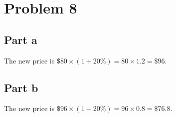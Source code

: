 \section*{Problem 8}
\subsection*{Part a}
The new price is $ \$80 \times (1 + 20\%) = 80 \times 1.2 = \$96 $.

\subsection*{Part b}
The new price is $ \$96 \times (1 - 20\%) = 96 \times 0.8 = \$76.8 $.
